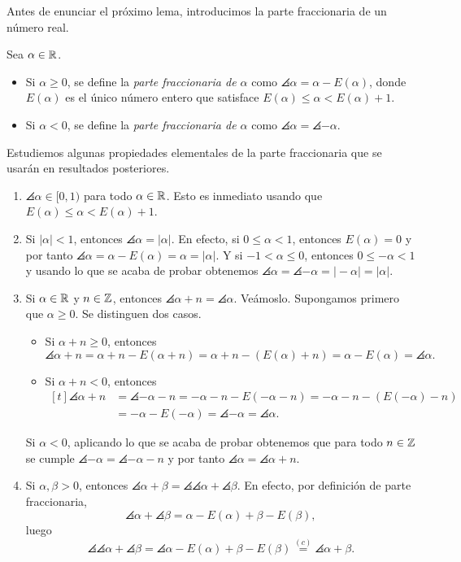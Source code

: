 \documentclass[a4paper, 12pt, oneside]{book}
\begin{document}
Antes de enunciar el próximo lema, introducimos la parte fraccionaria de un número real.

\begin{definition}
    Sea $\alpha \in \mathbb R$.
    \begin{itemize}
        \item Si $\alpha \geq 0$, se define la \emph{parte fraccionaria de $\alpha$} como $\angles{\alpha} = \alpha - E(\alpha)$, donde $E(\alpha)$ es el único número entero que satisface $E(\alpha) \leq \alpha < E(\alpha)+1$.
        \item Si $\alpha < 0$, se define la \emph{parte fraccionaria de $\alpha$} como $\angles{\alpha} = \angles{-\alpha}$.
    \end{itemize} 
\end{definition}

Estudiemos algunas propiedades elementales de la parte fraccionaria que se usarán en resultados posteriores.

\begin{enumerate}
    \item $\angles{\alpha} \in [0,1)$ para todo $\alpha\in\mathbb R$. Esto es inmediato usando que $E(\alpha) \leq \alpha < E(\alpha)+1$.
    \item Si $|\alpha| < 1$, entonces $\angles{\alpha}=|\alpha| $. En efecto, si $0 \leq \alpha < 1$, entonces $E(\alpha) = 0$ y por tanto $\angles{\alpha} = \alpha - E(\alpha) = \alpha = |\alpha|$. Y si $-1 < \alpha \leq 0$, entonces $0\leq -\alpha < 1$ y usando lo que se acaba de probar obtenemos $\angles{\alpha} = \angles{-\alpha} = |\!-\alpha| = |\alpha|$.
    \item Si $\alpha\in\mathbb R$ y $n \in \mathbb Z$, entonces $\angles{\alpha+n} = \angles{\alpha}$. Veámoslo. Supongamos primero que $\alpha \geq 0$. Se distinguen dos casos.
    \begin{itemize}
        \item Si $\alpha+n \geq 0$, entonces
        \[\angles{\alpha+n} = \alpha+n-E(\alpha+n) = \alpha+n-(E(\alpha)+n) = \alpha-E(\alpha) = \angles{\alpha}.\]
        \item Si $\alpha+n < 0$, entonces
        \[
        \begin{aligned}[t]
            \angles{\alpha+n} &= \angles{-\alpha-n} = -\alpha-n-E(-\alpha-n) = -\alpha-n-(E(-\alpha)-n) \\ &= -\alpha-E(-\alpha) = \angles{-\alpha} = \angles{\alpha}.
        \end{aligned}
        \]
    \end{itemize}
    Si $\alpha < 0$, aplicando lo que se acaba de probar obtenemos que para todo $n \in \mathbb Z$ se cumple $\angles{-\alpha} = \angles{-\alpha-n}$ y por tanto $\angles{\alpha} = \angles{\alpha+n}$.
    \item Si $\alpha,\beta > 0$, entonces $\angles{\alpha+\beta} = \angles{\angles{\alpha}+\angles{\beta}}$. En efecto, por definición de parte fraccionaria,
    \[\angles{\alpha}+\angles{\beta} = \alpha-E(\alpha)+\beta-E(\beta),\]
    luego
    \[\angles{\angles{\alpha}+\angles{\beta}} = \angles{\alpha-E(\alpha)+\beta-E(\beta)} \overset{(c)}{=} \angles{\alpha+\beta}.\]
\end{enumerate}
\end{document}
